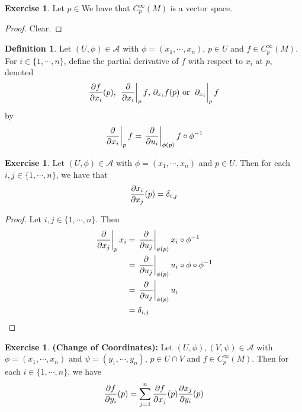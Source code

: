 \documentclass[12pt]{amsart}
\theoremstyle{definition}
\newtheorem{defn}[definition]{Definition}
\theoremstyle{remark}
\theoremstyle{definition}
\newtheorem{ex}[definition]{Exercise}
\newcommand{\del}{\delta}
\newcommand{\MA}{\mathcal{A}}
\begin{document}
	\begin{ex}
		Let $p \in $We have that $C_p^{\infty}(M)$ is a vector space.
	\end{ex}
	
	\begin{proof}
		Clear.
	\end{proof}

	\begin{defn}
		Let $(U, \phi) \in \MA$ with $\phi = (x_1, \cdots, x_n)$, $p \in U$ and $f \in C_p^{\infty}(M)$. For $i \in \{1, \cdots, n\}$, define the partial derivative of $f$ with respect to $x_i$ at $p$, denoted $$\frac{\partial f}{\partial x_i} (p) \text{, } \eval{\pdv{x_i}}_{p} f \text{, } \partial_{x_i} f (p) \text{ or } \eval{\partial_{x_i}}_{p} f$$ by $$ \eval{\pdv{x_i}}_{p} f =  \eval{\pdv{u_i}}_{\phi(p)} f \circ \phi^{-1} $$
	\end{defn}

	\begin{ex}
		Let $(U, \phi) \in \MA$ with $\phi = (x_1, \cdots, x_n)$ and $p \in U$. Then for each $i,j \in \{1, \cdots, n\}$, we have that $${\pdv{x_i}{x_j}}(p) = \del_{i,j}$$
	\end{ex}

	\begin{proof}
		Let $i,j \in \{1, \cdots, n\}$. Then 
		\begin{align*}
			\eval{\pdv{x_j}}_{p} x_i 
			&=  \eval{\pdv{u_j}}_{\phi(p)} x_i \circ \phi^{-1} \\
			&= \eval{\pdv{u_j}}_{\phi(p)} u_i \circ \phi \circ \phi^{-1} \\
			&= \eval{\pdv{u_j}}_{\phi(p)} u_i  \\
			&= \del_{i,j}
		\end{align*}
	\end{proof}

	\begin{ex} \textbf{(Change of Coordinates):}
		Let $(U, \phi), (V, \psi) \in \MA$ with $\phi = (x_1, \cdots, x_n)$ and $\psi = (y_1, \cdots, y_n)$, $p \in U \cap V$ and $f \in C_p^{\infty}(M)$. Then for each $i \in \{1, \cdots, n\}$, we have $${\pdv{f}{y_i}}(p) = \sum_{j =1}^n {\pdv{f}{x_j}}(p)   {\pdv{x_j}{y_i}}(p) $$
	\end{ex}
\end{document}
